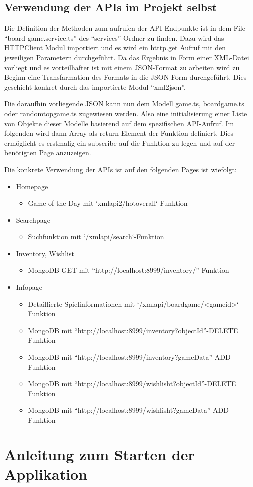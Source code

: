 \subsection{Verwendung der APIs im Projekt selbst}

Die Definition der Methoden zum aufrufen der API-Endpunkte ist in dem   File ``board-game.service.ts'' des ``services''-Ordner zu finden.
Dazu wird das HTTPClient Modul importiert und es wird ein htttp.get Aufruf mit den jeweiligen Parametern durchgeführt. Da das Ergebnis in Form einer XML-Datei vorliegt und es vorteilhafter ist mit einem JSON-Format zu arbeiten wird zu Beginn eine Transfarmation des Formats in die JSON Form durchgeführt.
Dies geschieht konkret durch das importierte Modul ``xml2json''. \bigskip 

Die daraufhin vorliegende JSON kann nun dem Modell game.ts, boardgame.ts oder randomtopgame.ts zugewiesen werden. Also eine initialisierung einer Liste von Objekte dieser Modelle basierend auf dem spezifischen API-Aufruf.
Im folgenden wird dann Array als return Element der Funktion definiert. Dies ermöglicht es erstmalig ein subscribe auf die Funktion zu legen und auf der benötigten Page anzuzeigen. \bigskip 

Die konkrete Verwendung der APIs ist auf den folgenden Pages ist wiefolgt:

\begin{itemize}
    \setlength{\itemsep}{-1pt}
    \setlength{\parskip}{-1pt}
    \item Homepage
        \begin{itemize}
        \item Game of the Day mit `xmlapi2/hotoverall`-Funktion
        \end{itemize}
    \item Searchpage
        \begin{itemize}
        \item Suchfunktion mit `/xmlapi/search`-Funktion
        \end{itemize}
    \item Inventory, Wishlist
        \begin{itemize}
        \item MongoDB GET mit ``http://localhost:8999/inventory/''-Funktion 
        \end{itemize}
    \item Infopage
    \begin{itemize}
    \item Detaillierte Spielinformationen mit `/xmlapi/boardgame/<gameid>`-Funktion 
    \item MongoDB mit ``http://localhost:8999/inventory?objectId''-DELETE Funktion
    \item MongoDB mit ``http://localhost:8999/inventory?gameData''-ADD Funktion
    \item MongoDB mit ``http://localhost:8999/wishlisht?objectId''-DELETE Funktion
    \item MongoDB mit ``http://localhost:8999/wishlisht?gameData''-ADD Funktion
    \end{itemize}

\end{itemize}

\section{Anleitung zum Starten der Applikation}
